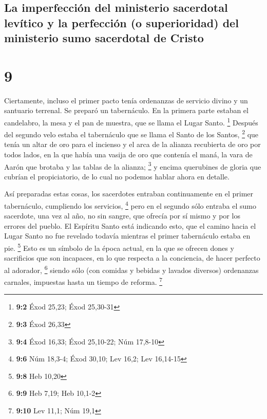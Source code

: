 \hypertarget{la-imperfecciuxf3n-del-ministerio-sacerdotal-levuxedtico-y-la-perfecciuxf3n-o-superioridad-del-ministerio-sumo-sacerdotal-de-cristo}{%
\subsection{La imperfección del ministerio sacerdotal levítico y la
perfección (o superioridad) del ministerio sumo sacerdotal de
Cristo}\label{la-imperfecciuxf3n-del-ministerio-sacerdotal-levuxedtico-y-la-perfecciuxf3n-o-superioridad-del-ministerio-sumo-sacerdotal-de-cristo}}

\hypertarget{section-8}{%
\section{9}\label{section-8}}

 Ciertamente, incluso el primer pacto tenía ordenanzas de
servicio divino y un santuario terrenal.  Se preparó un
tabernáculo. En la primera parte estaban el candelabro, la mesa y el pan
de muestra, que se llama el Lugar Santo. \footnote{\textbf{9:2} Éxod
  25,23; Éxod 25,30-31}  Después del segundo velo estaba
el tabernáculo que se llama el Santo de los Santos, \footnote{\textbf{9:3}
  Éxod 26,33}  que tenía un altar de oro para el incienso
y el arca de la alianza recubierta de oro por todos lados, en la que
había una vasija de oro que contenía el maná, la vara de Aarón que
brotaba y las tablas de la alianza; \footnote{\textbf{9:4} Éxod 16,33;
  Éxod 25,10-22; Núm 17,8-10}  y encima querubines de
gloria que cubrían el propiciatorio, de lo cual no podemos hablar ahora
en detalle.

 Así preparadas estas cosas, los sacerdotes entraban
continuamente en el primer tabernáculo, cumpliendo los servicios,
\footnote{\textbf{9:6} Núm 18,3-4; Éxod 30,10; Lev 16,2; Lev 16,14-15}
 pero en el segundo sólo entraba el sumo sacerdote, una
vez al año, no sin sangre, que ofrecía por sí mismo y por los errores
del pueblo.  El Espíritu Santo está indicando esto, que el
camino hacia el Lugar Santo no fue revelado todavía mientras el primer
tabernáculo estaba en pie. \footnote{\textbf{9:8} Heb 10,20}
 Esto es un símbolo de la época actual, en la que se
ofrecen dones y sacrificios que son incapaces, en lo que respecta a la
conciencia, de hacer perfecto al adorador, \footnote{\textbf{9:9} Heb
  7,19; Heb 10,1-2}  siendo sólo (con comidas y bebidas y
lavados diversos) ordenanzas carnales, impuestas hasta un tiempo de
reforma. \footnote{\textbf{9:10} Lev 11,1; Núm 19,1}

